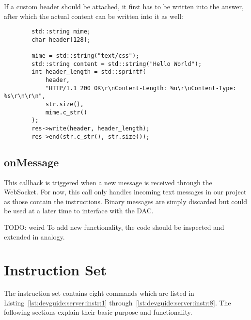 If a  custom header should be  attached, it first  has to be written  into the
answer, after which the actual content can be written into it as well:
\begin{tcolorbox}
    \begin{verbatim}
        std::string mime;
        char header[128];

        mime = std::string("text/css");
        std::string content = std::string("Hello World");
        int header_length = std::sprintf(
            header,
            "HTTP/1.1 200 OK\r\nContent-Length: %u\r\nContent-Type: %s\r\n\r\n",
            str.size(),
            mime.c_str()
        );
        res->write(header, header_length);
        res->end(str.c_str(), str.size());
    \end{verbatim}
\end{tcolorbox}



\subsection{onMessage} %
\label{subsec:devguide:server:onmessage}

This  callback  is triggered  when  a  new  message  is received  through  the
WebSocket.  For  now, this  call only  handles incoming  text messages  in our
project  as  those  contain  the instructions.   Binary  messages  are  simply
discarded but could be used at a later time to interface with the DAC.

TODO: weird
To add  new functionality,  the code should  be inspected and  extended in
analogy.

\section{Instruction Set} %
\label{sec:devguide:server:instruction}

The        instruction        set        contains        eight        commands
which     are      listed     in     Listing~\ref{lst:devguide:server:instr:1}
through~\ref{lst:devguide:server:instr:8}. The   following  sections   explain
their basic purpose and functionality.

